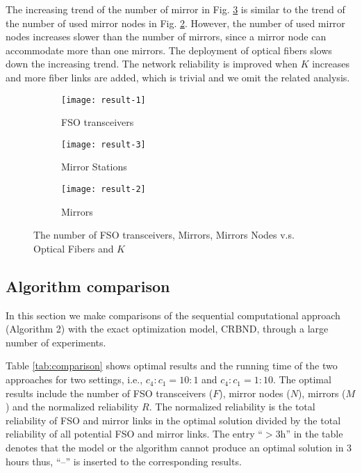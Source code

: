 \documentclass[onecolumn,11pt,draftclsnofoot]{IEEEtran}
\begin{document}
The increasing trend of the number of mirror in Fig. \ref{fig:mirrorNum} is similar to the trend of the number of used mirror nodes in Fig. \ref{fig:mirrorNodes}. However, the number of used mirror nodes increases slower than the number of mirrors, since a mirror node can accommodate more than one mirrors. The deployment of optical fibers slows down the increasing trend. The network reliability is improved when $K$ increases and more fiber links are added, which is trivial and we omit the related analysis.

\begin{figure}[!hbtp]
        \centering
        \begin{subfigure}[b]{0.32\textwidth}
                \centering
                \texttt{[image: result-1]}
                \caption{FSO transceivers}
                \label{fig:fso}
        \end{subfigure}
        \begin{subfigure}[b]{0.32\textwidth}
                \centering
                \texttt{[image: result-3]}
                \caption{Mirror Stations}
                \label{fig:mirrorNodes}
        \end{subfigure}
        \begin{subfigure}[b]{0.32\textwidth}
                \centering
                \texttt{[image: result-2]}
                \caption{Mirrors}
                \label{fig:mirrorNum}
        \end{subfigure}
        \caption{The number of FSO transceivers, Mirrors, Mirrors Nodes v.s. Optical Fibers and $K$}\label{fig:cost}
\end{figure}

\subsection{Algorithm comparison}
In this section we make comparisons of the sequential computational approach (Algorithm 2) with the exact optimization model, CRBND, through a large number of experiments.

Table \ref{tab:comparison} shows optimal results and the running time of the two approaches for two settings, i.e., $c_4:c_1=10:1$ and $c_4:c_1=1:10$. The optimal results include the number of FSO transceivers ($F$), mirror nodes ($N$), mirrors ($M$) and the normalized reliability $R$. The normalized reliability is the total reliability of FSO and mirror links in the optimal solution divided by the total reliability of all potential FSO and mirror links. The entry ``$>$3h'' in the table denotes that the model or the algorithm cannot produce an optimal solution in 3 hours thus, ``--'' is inserted to the corresponding results.
\end{document}
